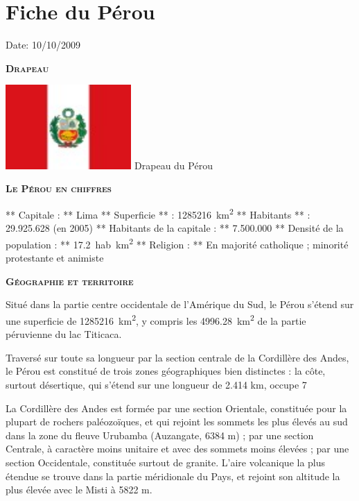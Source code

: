 \section{Fiche du Pérou}

Date: 10/10/2009

\begin{multicols}{2}

\textbf{\textsc{Drapeau}}

\hspace*{-0.65cm}
\includegraphics[width=4.8cm]{articles/Fiche-du-perou/1255177646Fug0.jpg}
Drapeau du Pérou

\textbf{\textsc{Le Pérou en chiffres}}

** Capitale : ** Lima
** Superficie ** : \SI{1285216}{km^2}
** Habitants ** : 29.925.628 (en 2005)
** Habitants de la capitale : ** 7.500.000
** Densité de la population : ** \SI{17,2}{hab.km^2}
** Religion : ** En majorité catholique ; minorité protestante et animiste

\textbf{\textsc{Géographie et territoire}}

Situé dans la partie centre occidentale de l'Amérique du Sud, le Pérou s'étend sur une superficie de \SI{1285216}{km^2}, y compris les \SI{4996.28}{km^2} de la partie péruvienne du lac Titicaca.

Traversé sur toute sa longueur par la section centrale de la Cordillère des Andes, le Pérou est constitué de trois zones géographiques bien distinctes : la côte, surtout désertique, qui s'étend sur une longueur de 2.414 km, occupe 7%

La Cordillère des Andes est formée par une section Orientale, constituée pour la plupart de rochers paléozoïques, et qui rejoint les sommets les plus élevés au sud dans la zone du fleuve Urubamba (Auzangate, 6384 m) ; par une section Centrale, à caractère moins unitaire et avec des sommets moins élevées ; par une section Occidentale, constituée surtout de granite. L'aire volcanique la plus étendue se trouve dans la partie méridionale du Pays, et rejoint son altitude la plus élevée avec le Misti à 5822 m.


\end{multicols}
